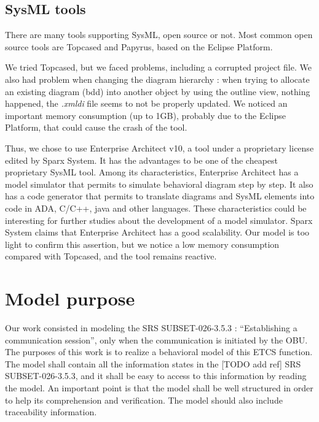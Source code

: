 \documentclass{template/openetcs_report}
\begin{document}
\subsection{SysML tools}

There are many tools supporting SysML, open source or not. Most common open source tools are Topcased and Papyrus, based on the Eclipse Platform. 

We tried Topcased, but we faced problems, including a corrupted project file. We also had problem when changing the diagram hierarchy : when trying to allocate an existing diagram (bdd) into another object by using the outline view, nothing happened, the \textsl{.xmldi} file seems to not be properly updated. We noticed an important memory consumption (up to 1GB), probably due to the Eclipse Platform, that could cause the crash of the tool. 

Thus, we chose to use Enterprise Architect v10, a tool under a proprietary license edited by Sparx System. It has the advantages to be one of the cheapest proprietary SysML tool. Among its characteristics, Enterprise Architect has a model simulator that permits to simulate behavioral diagram step by step. It also has a code generator that permits to translate diagrams and SysML elements into code in ADA, C/C++, java and other languages. These characteristics could be interesting for further studies about the development of a model simulator. Sparx System claims that Enterprise Architect has a good scalability. Our model is too light to confirm this assertion, but we notice a low memory consumption compared with Topcased, and the tool remains reactive.

\section{Model purpose}

Our work consisted in modeling the SRS SUBSET-026-3.5.3 \cite{SRS}: ``Establishing a communication session'', only when the communication is initiated by the OBU. The purposes of this work is to realize a behavioral model of this ETCS function. The model shall contain all the information states in the  [TODO add ref] SRS SUBSET-026-3.5.3, and it shall be easy to access to this information by reading the model. An important point is that the model shall be well structured in order to help its comprehension and verification. The model should also include traceability information.

\end{document}
